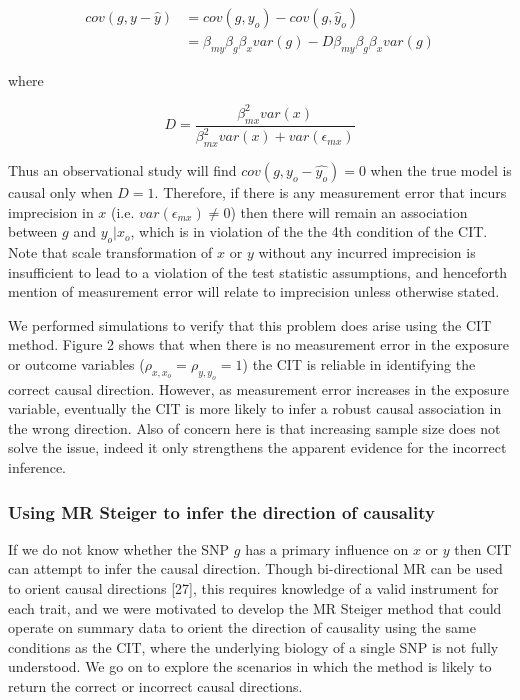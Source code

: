 \documentclass[]{article}
\begin{document}
\[
\begin{aligned}
cov(g, y - \hat{y}) & = cov(g, y_o) - cov(g, \hat{y}_o)  \\
                    & = \beta_{my} \beta_g \beta_x var(g) - D \beta_{my} \beta_g \beta_x var(g)
\end{aligned}
\]

where

\[
D = \frac{\beta^2_{mx} var(x)} {\beta^2_{mx} var(x) + var(\epsilon_{mx})}
\]

Thus an observational study will find \(cov(g, y_o - \hat{y_o}) = 0\)
when the true model is causal only when \(D = 1\). Therefore, if there
is any measurement error that incurs imprecision in \(x\) (i.e.
\(var(\epsilon_{mx}) \neq 0\)) then there will remain an association
between \(g\) and \(y_o | x_o\), which is in violation of the the 4th
condition of the CIT. Note that scale transformation of \(x\) or \(y\)
without any incurred imprecision is insufficient to lead to a violation
of the test statistic assumptions, and henceforth mention of measurement
error will relate to imprecision unless otherwise stated.

We performed simulations to verify that this problem does arise using
the CIT method. Figure 2 shows that when there is no measurement error
in the exposure or outcome variables (\(\rho_{x, x_o}=\rho_{y, y_o}=1\))
the CIT is reliable in identifying the correct causal direction.
However, as measurement error increases in the exposure variable,
eventually the CIT is more likely to infer a robust causal association
in the wrong direction. Also of concern here is that increasing sample
size does not solve the issue, indeed it only strengthens the apparent
evidence for the incorrect inference.

\subsubsection{Using MR Steiger to infer the direction of
causality}\label{using-mr-steiger-to-infer-the-direction-of-causality}

If we do not know whether the SNP \(g\) has a primary influence on \(x\)
or \(y\) then CIT can attempt to infer the causal direction. Though
bi-directional MR can be used to orient causal directions {[}27{]}, this
requires knowledge of a valid instrument for each trait, and we were
motivated to develop the MR Steiger method that could operate on summary
data to orient the direction of causality using the same conditions as
the CIT, where the underlying biology of a single SNP is not fully
understood. We go on to explore the scenarios in which the method is
likely to return the correct or incorrect causal directions.
\end{document}
